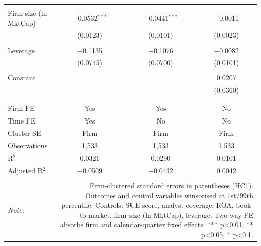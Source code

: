 \begin{table}[!htbp]
\begin{tabular}{@{\extracolsep{5pt}}lccc}
  & & & \\ 
 Firm size (ln MktCap) & $-$0.0532$^{***}$ & $-$0.0441$^{***}$ & $-$0.0011 \\ 
  & (0.0123) & (0.0101) & (0.0023) \\ 
  & & & \\ 
 Leverage & $-$0.1135 & $-$0.1076 & $-$0.0082 \\ 
  & (0.0745) & (0.0700) & (0.0101) \\ 
  & & & \\ 
 Constant &  &  & 0.0207 \\ 
  &  &  & (0.0360) \\ 
  & & & \\ 
\hline \\[-1.8ex] 
Firm FE & Yes & Yes & No \\ 
Time FE & Yes & No & No \\ 
Cluster SE & Firm & Firm & Firm \\ 
Observations & 1,533 & 1,533 & 1,533 \\ 
R$^{2}$ & 0.0321 & 0.0290 & 0.0101 \\ 
Adjusted R$^{2}$ & $-$0.0509 & $-$0.0432 & 0.0042 \\ 
\hline 
\hline \\[-1.8ex] 
\textit{Note:}  & \multicolumn{3}{r}{Firm-clustered standard errors in parentheses (HC1). Outcomes and control variables winsorised at 1st/99th percentile. Controls: SUE score, analyst coverage, ROA, book-to-market, firm size (ln MktCap), leverage. Two-way FE absorbs firm and calendar-quarter fixed effects. *** p<0.01, ** p<0.05, * p<0.1.} \\ 
\end{tabular} 
\end{table} 
